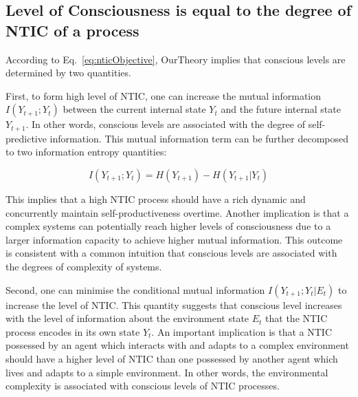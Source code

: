 \documentclass[utf8]{article}
\begin{document}
		
	    \subsection{Level of Consciousness is equal to the degree of NTIC of a process}\label{sec:cl}
            
            According to Eq.~\ref{eq:nticObjective}, \ac{OurTheory} implies that conscious levels are determined by two quantities. 
            
            First, to form high level of NTIC, one can increase the mutual information $I(Y_{t+1};Y_{t})$ between the current internal state $Y_t$ and the future internal state $Y_{t+1}$. In other words, conscious levels are associated with the degree of self-predictive information. This mutual information term can be further decomposed to two information entropy quantities: 
            
            \begin{equation}
            \label{eq:SelfEntropy}
            I(Y_{t+1};Y_{t}) = H(Y_{t+1}) - H(Y_{t+1}|Y_t)
            \end{equation}
            
            This implies that a high NTIC process should have a rich dynamic and concurrently maintain self-productiveness overtime. Another implication is that a complex systems can potentially reach higher levels of consciousness due to a larger information capacity to achieve higher mutual information. This outcome is consistent with a common intuition that conscious levels are associated with the degrees of complexity of systems.
    
    	    Second, one can minimise the conditional mutual information $I(Y_{t+1};Y_{t}|E_{t})$ to increase the level of NTIC. This quantity suggests that conscious level increases with the level of information about the environment state $E_t$ that the NTIC process encodes in its own state $Y_t$. An important implication is that a NTIC possessed by an agent which interacts with and adapts to a complex environment should have a higher level of NTIC than one possessed by another agent which lives and adapts to a simple environment. In other words, the environmental complexity is associated with conscious levels of NTIC processes.
    	   
\end{document}
